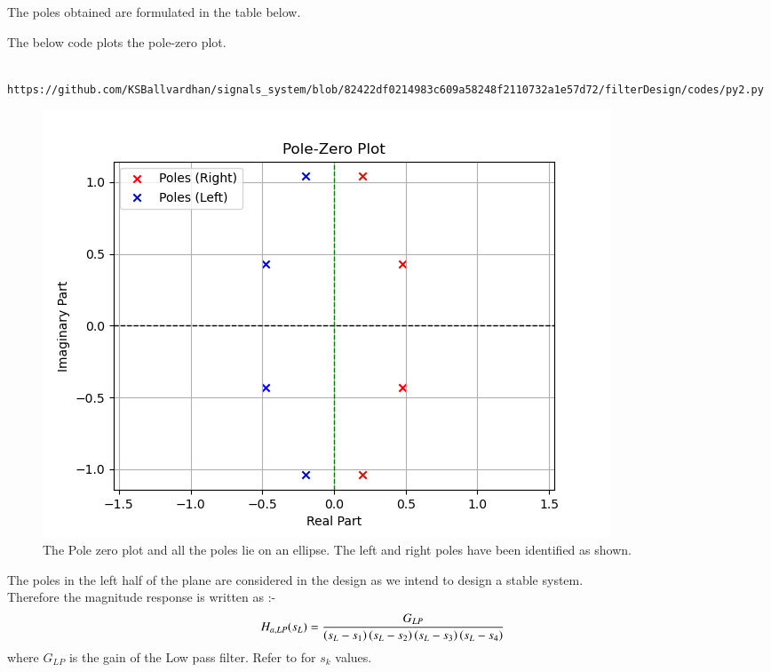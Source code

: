 \documentclass{article}
\begin{document}
\begin{enumerate}
		The poles obtained are formulated in the table below.
		
		The below code plots the pole-zero plot.
		\begin{lstlisting}
			https://github.com/KSBallvardhan/signals_system/blob/82422df0214983c609a58248f2110732a1e57d72/filterDesign/codes/py2.py
		\end{lstlisting}
		\newpage
		\begin{figure}[htbp]
			\centering
			\includegraphics[width=1\linewidth]{figs/fig2}
			\caption{The Pole zero plot and all the poles lie on an ellipse. The left and right poles have been identified as shown.}
			\label{fig:pole_zero_plt}
		\end{figure}
		The poles in the left half of the plane are considered in the design as we intend to design a stable system.\\
		Therefore the magnitude response is written as :- 
		\begin{align}
			H_{a,LP}(s_L) &= \frac{G_{LP}}{\left(s_L-s_1\right)\left(s_L-s_2\right)\left(s_L-s_3\right)\left(s_L-s_4\right)}
		\end{align}
		where $G_{LP}$ is the gain of the Low pass filter. Refer to  for $s_k$ values.\\
		

\end{enumerate}
\end{document}
